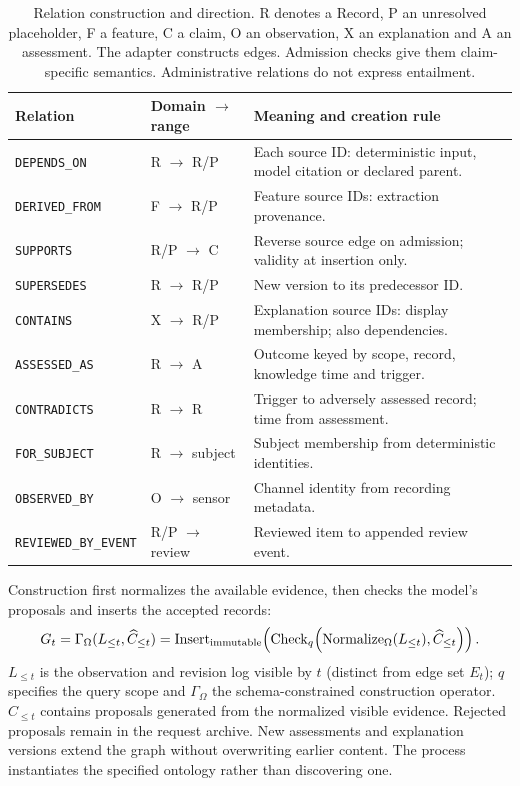 \documentclass[runningheads]{llncs}
\begin{document}
\begin{table}[!htbp]
\caption{Relation construction and direction. R denotes a Record, P an unresolved
placeholder, F a feature, C a claim, O an observation, X an explanation and A an
assessment. The adapter constructs edges. Admission checks give them claim-specific
semantics. Administrative relations do not express entailment.}
\label{tab:relations}
\centering\footnotesize\setlength{\tabcolsep}{3pt}
\begin{tabularx}{\textwidth}{l l X}
\toprule Relation & Domain $\to$ range & Meaning and creation rule\\\midrule
\texttt{DEPENDS\_ON} & R $\to$ R/P & Each source ID: deterministic input, model citation or declared parent.\\
\texttt{DERIVED\_FROM} & F $\to$ R/P & Feature source IDs: extraction provenance.\\
\texttt{SUPPORTS} & R/P $\to$ C & Reverse source edge on admission; validity at insertion only.\\
\texttt{SUPERSEDES} & R $\to$ R/P & New version to its predecessor ID.\\
\texttt{CONTAINS} & X $\to$ R/P & Explanation source IDs: display membership; also dependencies.\\
\texttt{ASSESSED\_AS} & R $\to$ A & Outcome keyed by scope, record, knowledge time and trigger.\\
\texttt{CONTRADICTS} & R $\to$ R & Trigger to adversely assessed record; time from assessment.\\
\texttt{FOR\_SUBJECT} & R $\to$ subject & Subject membership from deterministic identities.\\
\texttt{OBSERVED\_BY} & O $\to$ sensor & Channel identity from recording metadata.\\
\texttt{REVIEWED\_BY\_EVENT} & R/P $\to$ review & Reviewed item to appended review event.\\
\bottomrule
\end{tabularx}
\end{table}

Construction first normalizes the available evidence, then checks the model's
proposals and inserts the accepted records:
\begin{equation}
 G_t=\Gamma_\Omega(L_{\leq t},\widehat C_{\leq t})
 =\operatorname{Insert}_{\rm immutable}\!\left(
 \operatorname{Check}_q\!\left(\operatorname{Normalize}_\Omega(L_{\leq t}),
 \widehat C_{\leq t}\right)\right).
\label{eq:construction}
\end{equation}
$L_{\leq t}$ is the observation and revision log visible by $t$ (distinct from
edge set $E_t$); $q$ specifies the query scope and $\Gamma_\Omega$ the
schema-constrained construction operator. $\widehat C_{\leq t}$ contains
proposals generated from the normalized visible evidence. Rejected proposals
remain in the request archive. New assessments and explanation versions extend
the graph without overwriting earlier content. The process instantiates the
specified ontology rather than discovering one.
\end{document}
